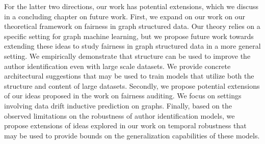 For the latter two directions, our work has potential extensions, which we discuss in a concluding chapter on future work.
First, we expand on our work on our theoretical framework on fairness in graph structured data.
Our theory relies on a specific setting for graph machine learning, but we propose future work towards extending these ideas to study fairness in graph structured data in a more general setting.
We empirically demonstrate that structure can be used to improve the author identification even with large scale datasets.
We provide concrete architectural suggestions that may be used to train models that utilize both the structure and content of large datasets.
Secondly, we propose potential extensions of our ideas proposed in the work on fairness auditing.
We focus on settings involving data drift inductive prediction on graphs.
Finally, based on the observed limitations on the robustness of author identification models, we propose extensions of ideas explored in our work on temporal robustness that may be used to provide bounds on the generalization capabilities of these models.

\endinput
